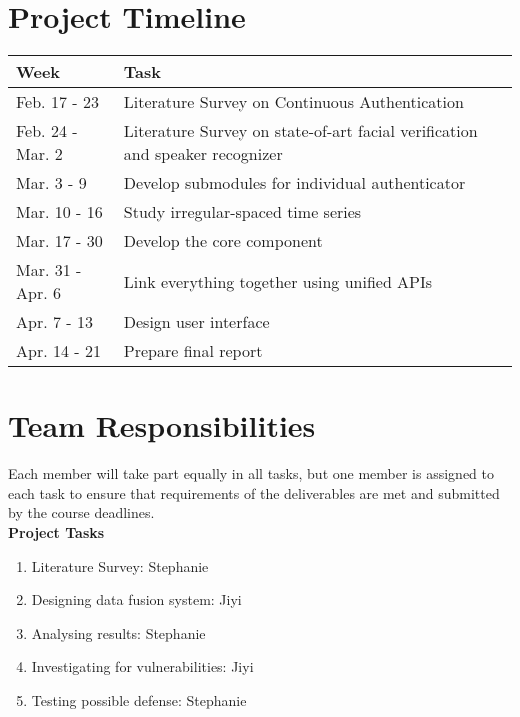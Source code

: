 \documentclass[a4paper, 11pt]{article}
\begin{document}
\section*{Project Timeline}
\begin{table}[H]
\begin{tabular}{|l|l|}
\hline
Week             & Task                                                                         \\ \hline
Feb. 17 - 23     & Literature Survey on Continuous Authentication                               \\ \hline
Feb. 24 - Mar. 2 & Literature Survey on state-of-art facial verification and speaker recognizer \\ \hline
Mar. 3 - 9       & Develop submodules for individual authenticator                              \\ \hline
Mar. 10 - 16     & Study irregular-spaced time series                                           \\ \hline
Mar. 17 - 30     & Develop the core component                                                   \\ \hline
Mar. 31 - Apr. 6 & Link everything together using unified APIs                                  \\ \hline
Apr. 7 - 13      & Design user interface                                                        \\ \hline
Apr. 14 - 21     & Prepare final report                                                         \\ \hline
\end{tabular}
\end{table}

\pagebreak
\section*{Team Responsibilities}

Each member will take part equally in all tasks, but one member is assigned to each task to ensure that requirements of the deliverables are met and submitted by the course deadlines. 
\newline\\		 	 	 								 
{\bf Project Tasks}
\begin{enumerate}
\item Literature Survey: Stephanie
\item Designing data fusion system: Jiyi
\item Analysing results: Stephanie
\item Investigating for vulnerabilities: Jiyi 
\item Testing possible defense: Stephanie
\end{enumerate} 
\end{document}
